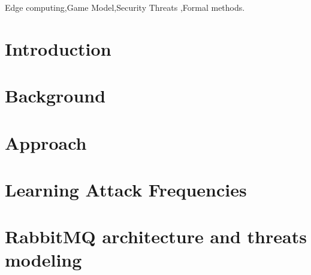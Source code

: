\documentclass[3p,times,preprint,number,round]{elsarticle}
\theoremstyle{definition}
\begin{document}
\begin{frontmatter}
\begin{abstract}
\end{abstract}

\begin{keyword}
Edge computing\sep Game Model\sep Security Threats \sep Formal methods.
\end{keyword}
\end{frontmatter}

\tableofcontents

\newpage

\section{Introduction}

\begin{sloppypar}

\end{sloppypar}

\section{Background}
\label{Preliminaries}
\begin{sloppypar}

\end{sloppypar}

\section{Approach}
\label{Approach}
\begin{sloppypar}

\end{sloppypar}

\section{Learning Attack Frequencies}
\label{frequencies}
\begin{sloppypar}

\end{sloppypar}


\section{RabbitMQ architecture and threats modeling}
\label{rabbitmq}
\begin{sloppypar}

\end{sloppypar}
\end{document}
